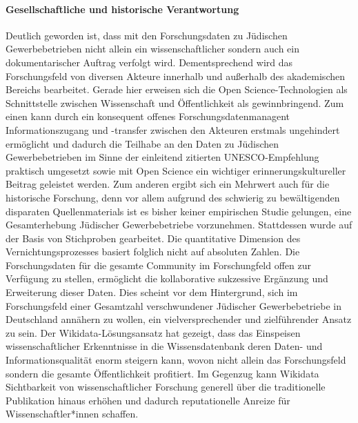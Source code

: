 \paragraph{Gesellschaftliche und historische Verantwortung} Deutlich geworden ist, dass mit den Forschungsdaten zu Jüdischen Gewerbebetrieben nicht allein ein wissenschaftlicher sondern auch ein dokumentarischer Auftrag verfolgt wird. Dementsprechend wird das Forschungsfeld von diversen Akteure innerhalb und außerhalb des akademischen Bereichs bearbeitet. Gerade hier erweisen sich die Open Science-Technologien als Schnittstelle zwischen Wissenschaft und Öffentlichkeit als gewinnbringend. Zum einen kann durch ein konsequent offenes Forschungsdatenmanagent Informationszugang und -transfer zwischen den Akteuren erstmals ungehindert ermöglicht und dadurch die Teilhabe an den Daten zu Jüdischen Gewerbebetrieben im Sinne der einleitend zitierten UNESCO-Empfehlung praktisch umgesetzt sowie mit Open Science ein wichtiger erinnerungskultureller Beitrag geleistet werden. Zum anderen ergibt sich ein Mehrwert auch für die historische Forschung, denn vor allem aufgrund des schwierig zu bewältigenden disparaten Quellenmaterials ist es bisher keiner empirischen Studie gelungen, eine Gesamterhebung Jüdischer Gewerbebetriebe vorzunehmen. Stattdessen wurde auf der Basis von Stichproben gearbeitet. Die quantitative Dimension des Vernichtungsprozesses basiert folglich nicht auf absoluten Zahlen. Die Forschungsdaten für die gesamte Community im Forschungfeld offen zur Verfügung zu stellen, ermöglicht die kollaborative sukzessive Ergänzung und Erweiterung dieser Daten. Dies scheint vor dem Hintergrund, sich im Forschungsfeld einer Gesamtzahl verschwundener Jüdischer Gewerbebetriebe in Deutschland annähern zu wollen, ein vielversprechender und zielführender Ansatz zu sein. Der Wikidata-Lösungsansatz hat gezeigt, dass das Einspeisen wissenschaftlicher Erkenntnisse in die Wissensdatenbank deren Daten- und Informationsqualität enorm steigern kann, wovon nicht allein das Forschungsfeld sondern die gesamte Öffentlichkeit profitiert. Im Gegenzug kann Wikidata Sichtbarkeit von wissenschaftlicher Forschung generell über die traditionelle Publikation hinaus erhöhen und dadurch reputationelle Anreize für Wissenschaftler*innen schaffen.

